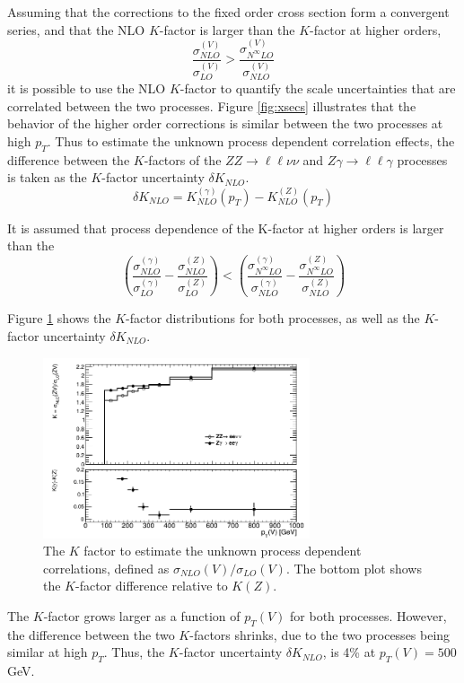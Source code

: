 \documentclass[12pt,a4paper,openright,twoside]{report}
\newcommand{\ZZ}{$ZZ\to \ell\ell\nu\nu$ }
\newcommand{\Zg}{$Z\gamma\to \ell\ell\gamma$ }
\begin{document}
Assuming that the corrections to the fixed order cross section form a convergent series, and that the NLO $K$-factor is larger than the $K$-factor at higher orders,
\begin{equation}
\frac{\sigma^{(V)}_{NLO}}{\sigma^{(V)}_{LO}} >\frac{\sigma^{(V)}_{N^{\infty}LO}}{\sigma^{(V)}_{NLO}}
\end{equation}
it is possible to use the NLO $K$-factor to quantify the scale uncertainties that are correlated between the two processes. Figure \ref{fig:xsecs} illustrates that the behavior of the higher order corrections is similar between the two processes at high $p_T$. Thus to estimate the unknown process dependent correlation effects, the difference between the $K$-factors of the \ZZ and \Zg processes is taken as the $K$-factor uncertainty $\delta K_{NLO}$.
\begin{equation}
\delta K_{NLO} = K_{NLO}^{(\gamma)}(p_T) - K_{NLO}^{(Z)}(p_T)
\label{eq:K_factor_unc}
\end{equation}

It is assumed that process dependence of the K-factor at higher orders is larger than the
\begin{equation}
\left(\frac{\sigma^{(\gamma)}_{NLO}}{\sigma^{(\gamma)}_{LO}}-\frac{\sigma^{(Z)}_{NLO}}{\sigma^{(Z)}_{LO}}\right) <\left(\frac{\sigma^{(\gamma)}_{N^{\infty}LO}}{\sigma^{(\gamma)}_{NLO}}-\frac{\sigma^{(Z)}_{N^{\infty}LO}}{\sigma^{(Z)}_{NLO}}\right)
\end{equation}

Figure \ref{fig:K_pt} shows the $K$-factor distributions for both processes, as well as the $K$-factor uncertainty $\delta K_{NLO}$.
\begin{figure}[H]
\centering
	\includegraphics[width=0.7\textwidth]{K_pt.png}
	\caption{The $K$ factor to estimate the unknown process dependent correlations, defined as $\sigma_{NLO}(V)/\sigma_{LO}(V)$. The bottom plot shows the $K$-factor difference relative to $K(Z)$.}
	\label{fig:K_pt}
\end{figure}
The $K$-factor grows larger as a function of $p_T(V)$ for both processes. However, the difference between the two $K$-factors shrinks, due to the two processes being similar at high $p_T$. Thus, the $K$-factor uncertainty $\delta K_{NLO}$, is 4\% at $p_T(V) = 500$ GeV.
\end{document}
